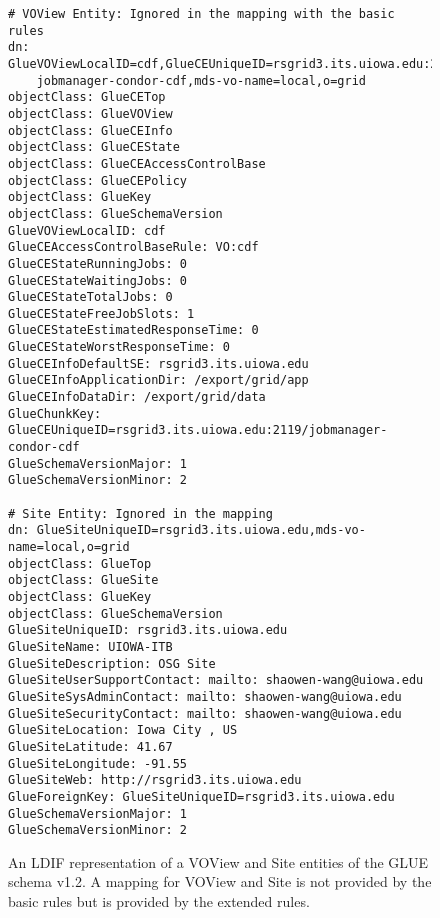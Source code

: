 \documentclass[12pt]{article}
\begin{document}
\begin{figure}
\scriptsize
\begin{verbatim}
# VOView Entity: Ignored in the mapping with the basic rules
dn: GlueVOViewLocalID=cdf,GlueCEUniqueID=rsgrid3.its.uiowa.edu:2119/
    jobmanager-condor-cdf,mds-vo-name=local,o=grid
objectClass: GlueCETop
objectClass: GlueVOView
objectClass: GlueCEInfo
objectClass: GlueCEState
objectClass: GlueCEAccessControlBase
objectClass: GlueCEPolicy
objectClass: GlueKey
objectClass: GlueSchemaVersion
GlueVOViewLocalID: cdf
GlueCEAccessControlBaseRule: VO:cdf
GlueCEStateRunningJobs: 0
GlueCEStateWaitingJobs: 0
GlueCEStateTotalJobs: 0
GlueCEStateFreeJobSlots: 1
GlueCEStateEstimatedResponseTime: 0
GlueCEStateWorstResponseTime: 0
GlueCEInfoDefaultSE: rsgrid3.its.uiowa.edu
GlueCEInfoApplicationDir: /export/grid/app
GlueCEInfoDataDir: /export/grid/data
GlueChunkKey: GlueCEUniqueID=rsgrid3.its.uiowa.edu:2119/jobmanager-condor-cdf
GlueSchemaVersionMajor: 1
GlueSchemaVersionMinor: 2

# Site Entity: Ignored in the mapping
dn: GlueSiteUniqueID=rsgrid3.its.uiowa.edu,mds-vo-name=local,o=grid
objectClass: GlueTop
objectClass: GlueSite
objectClass: GlueKey
objectClass: GlueSchemaVersion
GlueSiteUniqueID: rsgrid3.its.uiowa.edu
GlueSiteName: UIOWA-ITB
GlueSiteDescription: OSG Site
GlueSiteUserSupportContact: mailto: shaowen-wang@uiowa.edu
GlueSiteSysAdminContact: mailto: shaowen-wang@uiowa.edu
GlueSiteSecurityContact: mailto: shaowen-wang@uiowa.edu
GlueSiteLocation: Iowa City , US
GlueSiteLatitude: 41.67
GlueSiteLongitude: -91.55
GlueSiteWeb: http://rsgrid3.its.uiowa.edu
GlueForeignKey: GlueSiteUniqueID=rsgrid3.its.uiowa.edu
GlueSchemaVersionMajor: 1
GlueSchemaVersionMinor: 2
\end{verbatim}
\normalsize
\caption[Example of an LDIF Representation of the VOView and Site entities of
the  GLUE Schema]{\label{LDIF-VOView-Site-Example} An LDIF representation
of a VOView and Site entities of the GLUE schema v1.2. A mapping
for VOView and Site is not provided by the basic rules but is provided by the extended
rules.}
\end{figure}
\end{document}
